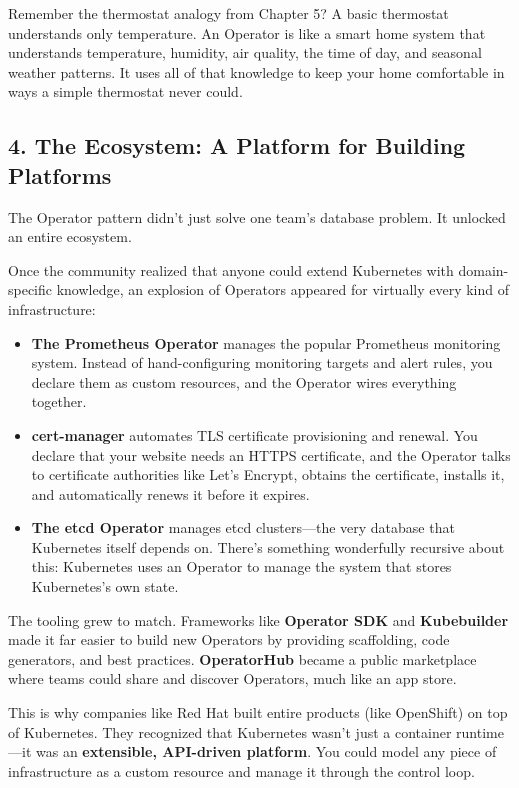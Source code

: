 Remember the thermostat analogy from Chapter 5? A basic thermostat understands only temperature. An Operator is like a smart home system that understands temperature, humidity, air quality, the time of day, and seasonal weather patterns. It uses all of that knowledge to keep your home comfortable in ways a simple thermostat never could.


\subsection{4. The Ecosystem: A Platform for Building Platforms}


The Operator pattern didn't just solve one team's database problem. It unlocked an entire ecosystem.

Once the community realized that anyone could extend Kubernetes with domain-specific knowledge, an explosion of Operators appeared for virtually every kind of infrastructure:

\begin{itemize}
\item \textbf{The Prometheus Operator} manages the popular Prometheus monitoring system. Instead of hand-configuring monitoring targets and alert rules, you declare them as custom resources, and the Operator wires everything together.
\item \textbf{cert-manager} automates TLS certificate provisioning and renewal. You declare that your website needs an HTTPS certificate, and the Operator talks to certificate authorities like Let's Encrypt, obtains the certificate, installs it, and automatically renews it before it expires.
\item \textbf{The etcd Operator} manages etcd clusters---the very database that Kubernetes itself depends on. There's something wonderfully recursive about this: Kubernetes uses an Operator to manage the system that stores Kubernetes's own state.
\end{itemize}

The tooling grew to match. Frameworks like \textbf{Operator SDK} and \textbf{Kubebuilder} made it far easier to build new Operators by providing scaffolding, code generators, and best practices. \textbf{OperatorHub} became a public marketplace where teams could share and discover Operators, much like an app store.

This is why companies like Red Hat built entire products (like OpenShift) on top of Kubernetes. They recognized that Kubernetes wasn't just a container runtime---it was an \textbf{extensible, API-driven platform}. You could model any piece of infrastructure as a custom resource and manage it through the control loop.

